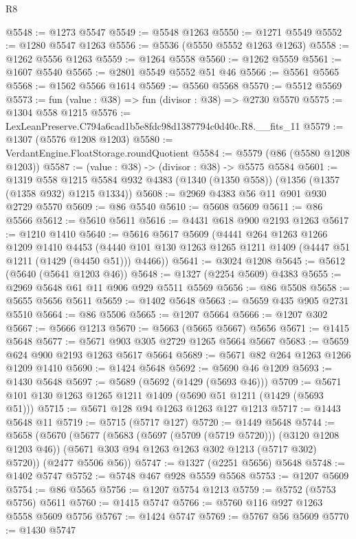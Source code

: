 \begin{lexlean}{R8}
\begin{coremodule}
@5548 := @1273 @5547
@5549 := @5548 @1263
@5550 := @1271 @5549
@5552 := @1280 @5547 @1263
@5556 := @5536 (@5550 @5552 @1263 @1263)
@5558 := @1262 @5556 @1263
@5559 := @1264 @5558
@5560 := @1262 @5559
@5561 := @1607 @5540
@5565 := @2801 @5549 @5552 @51 @46
@5566 := @5561 @5565
@5568 := @1562 @5566 @1614
@5569 := @5560 @5568
@5570 := @5512 @5569
@5573 := fun (value : @38) => fun (divisor : @38) => @2730 @5570
@5575 := @1304 @558 @1215
@5576 := LexLeanPreserve.C794a6cad1b5e8fdc98d1387794c0d40c.R8.__fits_11
@5579 := @1307 (@5576 @1208 @1203)
@5580 := VerdantEngine.FloatStorage.roundQuotient
@5584 := @5579 (@86 (@5580 @1208 @1203))
@5587 := (value : @38) -> (divisor : @38) -> @5575 @5584
@5601 := @1319
    @558
    @1215
    @5584
    @932
    @4383
    (@1340 (@1350 @558))
    (@1356 (@1357 (@1358 @932) @1215 @1334))
@5608 := @2969 @4383 @56 @11 @901 @930 @2729 @5570
@5609 := @86 @5540
@5610 := @5608 @5609
@5611 := @86 @5566
@5612 := @5610 @5611
@5616 := @4431 @618 @900 @2193 @1263
@5617 := @1210 @1410
@5640 := @5616
    @5617
    @5609
    (@4441
      @264
      @1263
      @1266
      @1209
      @1410
      @4453
      (@4440 @101 @130 @1263 @1265 @1211 @1409 (@4447 @51 @1211 (@1429 (@4450 @51))) @4466))
@5641 := @3024 @1208
@5645 := @5612 (@5640 (@5641 @1203 @46))
@5648 := @1327 (@2254 @5609) @4383
@5655 := @2969 @5648 @61 @11 @906 @929 @5511 @5569
@5656 := @86 @5508
@5658 := @5655 @5656 @5611
@5659 := @1402 @5648
@5663 := @5659 @435 @905 @2731 @5510
@5664 := @86 @5506
@5665 := @1207 @5664
@5666 := @1207 @302
@5667 := @5666 @1213
@5670 := @5663 (@5665 @5667) @5656
@5671 := @1415 @5648
@5677 := @5671 @903 @305 @2729 @1265 @5664 @5667
@5683 := @5659 @624 @900 @2193 @1263 @5617 @5664
@5689 := @5671 @82 @264 @1263 @1266 @1209 @1410
@5690 := @1424 @5648
@5692 := @5690 @46 @1209
@5693 := @1430 @5648
@5697 := @5689 (@5692 (@1429 (@5693 @46)))
@5709 := @5671 @101 @130 @1263 @1265 @1211 @1409 (@5690 @51 @1211 (@1429 (@5693 @51)))
@5715 := @5671 @128 @94 @1263 @1263 @127 @1213
@5717 := @1443 @5648 @11
@5719 := @5715 (@5717 @127)
@5720 := @1449 @5648
@5744 := @5658
    (@5670
      (@5677
        (@5683 (@5697 (@5709 (@5719 @5720))) (@3120 @1208 @1203 @46))
        (@5671 @303 @94 @1263 @1263 @302 @1213 (@5717 @302) @5720))
      (@2477 @5506 @56))
@5747 := @1327 (@2251 @5656) @5648
@5748 := @1402 @5747
@5752 := @5748 @467 @928 @5559 @5568
@5753 := @1207 @5609
@5754 := @86 @5565
@5756 := @1207 @5754 @1213
@5759 := @5752 (@5753 @5756) @5611
@5760 := @1415 @5747
@5766 := @5760 @116 @927 @1263 @5558 @5609 @5756
@5767 := @1424 @5747
@5769 := @5767 @56 @5609
@5770 := @1430 @5747

\end{coremodule}
\end{lexlean}
